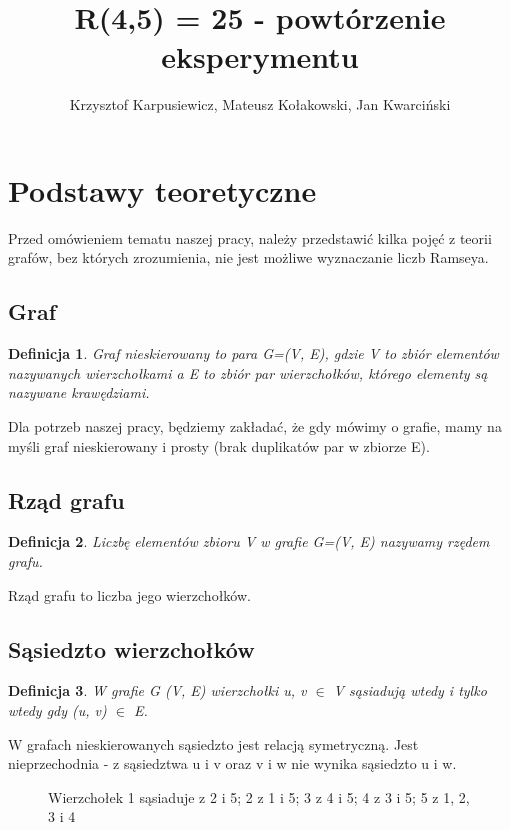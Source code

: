 \documentclass[11pt]{article}
\title{R(4,5) = 25 - powtórzenie eksperymentu}
\author{Krzysztof Karpusiewicz, Mateusz Kołakowski, Jan Kwarciński}
\newtheorem{definition}{Definicja}[section]
\begin{document}
\tableofcontents
\pagebreak

\section{Podstawy teoretyczne}

  Przed omówieniem tematu naszej pracy, należy przedstawić kilka pojęć z teorii grafów, bez których zrozumienia, nie jest możliwe wyznaczanie liczb Ramseya.

  \subsection{Graf}
  \begin{definition}
    Graf nieskierowany to para G=(V, E), gdzie V to zbiór elementów nazywanych wierzchołkami a E to zbiór par wierzchołków, którego elementy są nazywane krawędziami.
  \end{definition}

  Dla potrzeb naszej pracy, będziemy zakładać, że gdy mówimy o grafie, mamy na myśli graf nieskierowany i prosty (brak duplikatów par w zbiorze E).
  
  \subsection{Rząd grafu}
  \begin{definition}
    Liczbę elementów zbioru V w grafie G=(V, E) nazywamy rzędem grafu. 
  \end{definition}

  Rząd grafu to liczba jego wierzchołków. 

  \subsection{Sąsiedzto wierzchołków}
  \begin{definition}
    W grafie G (V, E) wierzchołki u, v $\in$ V sąsiadują wtedy i tylko wtedy gdy (u, v) $\in$ E.    
  \end{definition}
  W grafach nieskierowanych sąsiedzto jest relacją symetryczną. Jest nieprzechodnia - z sąsiedztwa u i v oraz v i w nie wynika sąsiedzto u i w. \linebreak

  \begin{figure}[h]
    \centering
    \caption{Wierzchołek 1 sąsiaduje z 2 i 5; 2 z 1 i 5; 3 z 4 i 5; 4 z 3 i 5; 5 z 1, 2, 3 i 4 }
  \end{figure}
\end{document}
